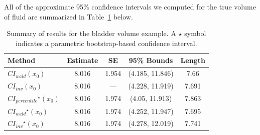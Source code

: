 \documentclass{article}\usepackage[]{graphicx}\usepackage[]{color}
\newcommand{\boot}{\ensuremath{^\star}}
\begin{document}
% 

All of the approximate 95\% confidence intervals we computed for the true volume of fluid are summarized in Table~\ref{tab:summary} below.



\begin{table}[!htb]
\centering
\begin{tabular}{lcccc}
  \toprule
  Method                      &  Estimate & SE & 95\% Bounds & Length \\
  \midrule
  $CI_{wald}\left(x_0\right)$                 & 8.016 & 1.954 & (4.185, 11.846) & 7.66 \\
  $CI_{inv}\left(x_0\right)$            & 8.016 &  ---            & (4.228, 11.919) & 7.691 \\
  $CI_{percentile}\boot\left(x_0\right)$     & 8.016 & 1.974 & (4.05, 11.913) & 7.863 \\
  $CI_{wald}\boot\left(x_0\right)$           & 8.016 & 1.974 & (4.252, 11.947) & 7.695 \\
  $CI_{inv}\boot\left(x_0\right)$      & 8.016 & 1.974 & (4.278, 12.019) & 7.741 \\
  \bottomrule
\end{tabular}
\caption{Summary of results for the bladder volume example.  A $\star$ symbol indicates a parametric bootstrap-based confidence interval. \label{tab:summary}}
\end{table}
\end{document}
